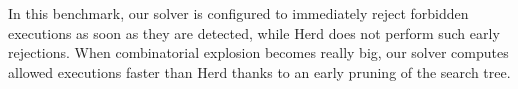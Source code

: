 In this benchmark, our solver is configured to immediately reject 
forbidden executions as soon as they are detected, while Herd does not perform 
such early rejections.
When combinatorial explosion becomes really big, our solver computes allowed executions
faster than Herd thanks to an early pruning of the search tree.


